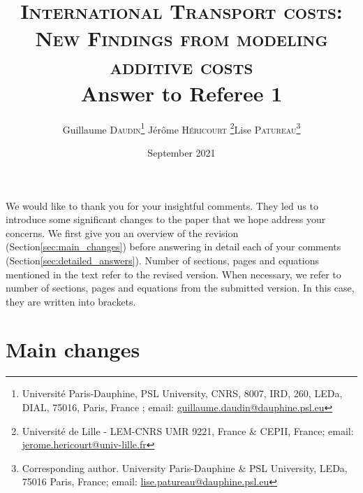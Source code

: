 \documentclass[a4paper,11pt]{article}
\begin{document}
\title{\textsc{International Transport costs:\\New Findings from modeling additive costs} \\
Answer to Referee 1}

\author{Guillaume \textsc{Daudin}\thanks{%
Université Paris-Dauphine, PSL University, CNRS, 8007, IRD, 260, LEDa, DIAL, 75016, Paris, France ; email: \url{guillaume.daudin@dauphine.psl.eu}}  \qquad J\'{e}r\^{o}me \textsc{H\'{e}ricourt} \thanks{Universit\'{e} de Lille - LEM-CNRS UMR 9221, France \& CEPII, France; email: \url{jerome.hericourt@univ-lille.fr}}\qquad Lise \textsc{Patureau}\thanks{Corresponding author.
University Paris-Dauphine \& PSL University, LEDa, 75016 Paris, France;  email: \url{lise.patureau@dauphine.psl.eu} } }


\date{September 2021}
 \maketitle
\bigskip

We would like to thank you for your insightful comments. They led us to introduce some
significant changes to the paper that we hope address your concerns. We first give you an overview
of the revision (Section\ref{sec:main_changes}) before answering in detail each of your comments (Section\ref{sec:detailed_answers}). Number of sections, pages and equations mentioned in the text refer to the revised version. When necessary, we refer to number of sections, pages and equations from the submitted version. In this case, they are written into brackets.

\section{Main changes \label{sec:main_changes}}
\end{document}
